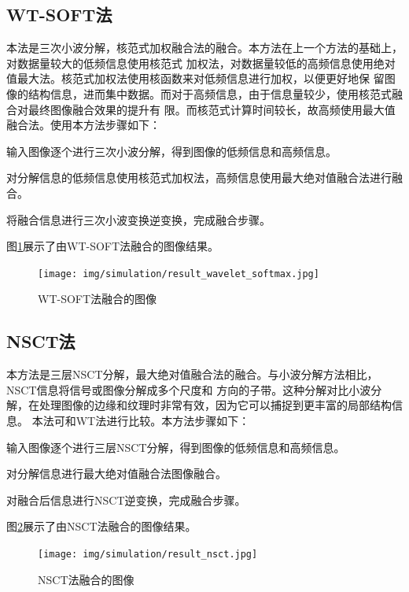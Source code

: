 \documentclass{xduugthesis}
\begin{document}
\subsection{WT-SOFT法}
本法是三次小波分解，核范式加权融合法的融合。本方法在上一个方法的基础上，对数据量较大的低频信息使用核范式
加权法，对数据量较低的高频信息使用绝对值最大法。核范式加权法使用核函数来对低频信息进行加权，以便更好地保
留图像的结构信息，进而集中数据。而对于高频信息，由于信息量较少，使用核范式融合对最终图像融合效果的提升有
限。而核范式计算时间较长，故高频使用最大值融合法。使用本方法步骤如下：\\
\begin{enumerate*}[itemjoin=\\\hspace*{\parindent}, itemsep=5mm\hspace*{\parindent}]
	\item 输入图像逐个进行三次小波分解，得到图像的低频信息和高频信息。
	\item 对分解信息的低频信息使用核范式加权法，高频信息使用最大绝对值融合法进行融合。
	\item 将融合信息进行三次小波变换逆变换，完成融合步骤。
\end{enumerate*}\par
图\ref{simulation_wavelet_softmax}展示了由WT-SOFT法融合的图像结果。
\begin{figure}[!htb]
	\texttt{[image: img/simulation/result\_wavelet\_softmax.jpg]}
	\caption{WT-SOFT法融合的图像}\label{simulation_wavelet_softmax}
\end{figure}
\subsection{NSCT法}\par
本方法是三层NSCT分解，最大绝对值融合法的融合。与小波分解方法相比，NSCT信息将信号或图像分解成多个尺度和
方向的子带。这种分解对比小波分解，在处理图像的边缘和纹理时非常有效，因为它可以捕捉到更丰富的局部结构信息。
本法可和WT法进行比较。本方法步骤如下：\\
\begin{enumerate*}[itemjoin=\\\hspace*{\parindent}, itemsep=5mm\hspace*{\parindent}]
	\item 输入图像逐个进行三层NSCT分解，得到图像的低频信息和高频信息。
	\item 对分解信息进行最大绝对值融合法图像融合。
	\item 对融合后信息进行NSCT逆变换，完成融合步骤。
\end{enumerate*}\par
图\ref{simulation_nsct}展示了由NSCT法融合的图像结果。
\begin{figure}[!htb]
	\texttt{[image: img/simulation/result\_nsct.jpg]}
	\caption{NSCT法融合的图像}\label{simulation_nsct}
\end{figure}
\end{document}
